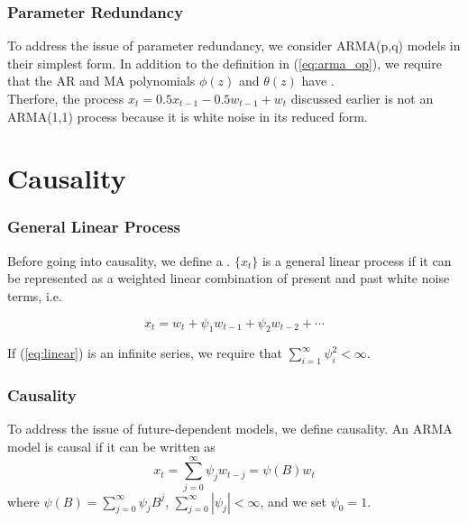 \documentclass[%
xcolor=pdftex]{beamer}
\begin{document}
\begin{frame}
\frametitle{Parameter Redundancy}

To address the issue of parameter redundancy, we consider ARMA(p,q) models in their simplest form. In addition to the definition in (\ref{eq:arma_op}), we require that the AR and MA polynomials $\phi(z)$ and $\theta(z)$ have \underline{\hspace{30 mm}}. \\
\vspace{5mm}
Therfore, the process $x_t=0.5 x_{t-1}-0.5 w_{t-1}+w_t$ discussed earlier is not an ARMA(1,1) process because it is white noise in its reduced form.

\end{frame}

\section{Causality}
\frame{\tableofcontents[currentsection]}

\begin{frame}
\frametitle{General Linear Process}

Before going into causality, we define a \underline{\hspace{40 mm}}. $\{x_t\}$ is a general linear process if it can be represented as a weighted linear combination of present and past white noise terms, i.e.

\begin{equation} \label{eq:linear}
x_t = w_t + \psi_1 w_{t-1} + \psi_2 w_{t-2} + \cdots
\end{equation}

If (\ref{eq:linear}) is an infinite series, we require that $\sum_{i=1}^{\infty} \psi_i^2 < \infty$.

\end{frame}


\begin{frame}
\frametitle{Causality}

To address the issue of future-dependent models, we define causality. An ARMA model is causal if it can be written as
\begin{equation} \label{eq:causal}
x_t=\sum_{j=0}^\infty \psi_j w_{t-j}=\psi(B) w_t
\end{equation}
where $\psi(B)=\sum_{j=0}^\infty \psi_j  B^j$, $\sum_{j=0}^\infty |\psi_j| < \infty$, and we set $\psi_0 = 1$.

\end{frame}
\end{document}

